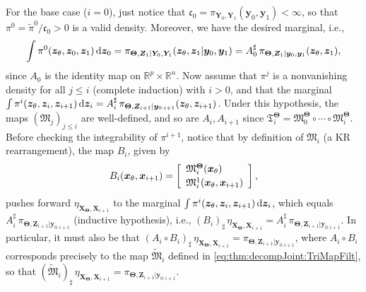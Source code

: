 \documentclass[twoside,11pt]{article}
\newcommand{\push}{_\sharp}                                      %
\newcommand{\re}{\mathbb{R}}
\newcommand{\Xb}{\boldsymbol{X}}
\newcommand{\xb}{\boldsymbol{x}}
\newcommand{\Yb}{\boldsymbol{Y}}
\newcommand{\yb}{\boldsymbol{y}}
\newcommand{\Zb}{\boldsymbol{Z}}
\newcommand{\zb}{\boldsymbol{z}}
\newcommand{\vhyp}{\boldsymbol{\Theta}}
\newcommand{\vhyps}{\theta}
\newcommand{\dhyp}{p}
\newcommand{\submap}{\mathfrak{M}}
\newcommand{\pull}{^\sharp}
\begin{document}
For the base case ($i=0$), just notice that
$\mathfrak{c}_0 =  \pi_{\Yb_0,\Yb_1}(\yb_0,\yb_1) < \infty$,
%
%
%
%
%
so that
$\pi^0 = \widetilde{\pi}^0 / \mathfrak{c}_0 > 0$ is a valid density.
%
%
%
%
Moreover, we have the desired marginal, i.e., %
\begin{equation}
  \int \pi^0(\zb_{\vhyps},\zb_0 , \zb_{1}) \, {\rm d}\zb_0=
  \pi_{\vhyp,\Zb_1\vert\Yb_0,\Yb_1}(\zb_{\vhyps},\zb_{1}\vert \yb_0, \yb_1) =
  A_0\pull\,\pi_{\vhyp,\Zb_1\vert\yb_0,\yb_1}(\zb_{\vhyps},\zb_{1}),  
\end{equation}
since $A_0$ is the identity map on $\re^{\dhyp}\times \re^n$.
%
Now assume that %
$\pi^j$ is a nonvanishing density
for all 
$j \le i$ (complete induction) with $i>0$, and that the marginal
$\int \pi^i(\zb_{\vhyps},\zb_i,\zb_{i+1}) \, {\rm d}\zb_{i} =  
A_i\pull\,\pi_{\vhyp, \Zb_{i+1} \vert \yb_{0:i+1}}(\zb_{\vhyps},\zb_{i+1})$.
%
%
%
%
Under this hypothesis,
the maps $(\submap_j)_{j \le i}$ are well-defined, and so are
%
%
$A_i,A_{i+1}$ since $\mathfrak{T}^{\vhyp}_{i} = 
\submap_0^{\vhyp} \circ \cdots \circ  \submap_{i}^{\vhyp}$.
%
%
Before checking the integrability of $\pi^{i+1}$, 
notice that by definition of $\submap_i$ (a KR
rearrangement), the map
$B_i$, given by %
    \begin{equation}   
      B_i( \xb_{\vhyps} , \xb_{i+1} ) = 
      \left[\begin{array}{l}
      \submap^{\vhyp}_{i}(  \xb_{\vhyps} )\\[\spacinglines] 
      \submap^1_i( \xb_{\vhyps} , \xb_{i+1}  )
      \end{array}\right],%
    \end{equation}
pushes forward $\eta_{\Xb_{\vhyp},\Xb_{i+1}}$ to the marginal
$\int \pi^i(\zb_{\vhyps},\zb_i,\zb_{i+1}) \, {\rm d}\zb_{i}$, which equals
$A_i\pull\,\pi_{\vhyp, \Zb_{i+1} \vert \yb_{0:i+1}}$
(inductive hypothesis), i.e., %
$(B_i)\push \,\eta_{\Xb_{\vhyp},\Xb_{i+1}} = 
A_i\pull\,\pi_{\vhyp, \Zb_{i+1} \vert \yb_{0:i+1}}$.  
In particular, it must also be that
$(A_i \circ B_i)\push\,\eta_{\Xb_{\vhyp},\Xb_{i+1} }
=
\pi_{ \vhyp, \Zb_{i+1} \vert \yb_{0:i+1}}$, where
$A_i \circ B_i$ corresponds precisely to the
map $\widetilde{\submap}_i$ defined in
\eqref{eq:thm:decompJoint:TriMapFilt}, so that
$(\widetilde{\submap}_i) \push\,\eta_{\Xb_{\vhyp},\Xb_{i+1} }
=
\pi_{ \vhyp, \Zb_{i+1} \vert \yb_{0:i+1}}$.
\end{document}

